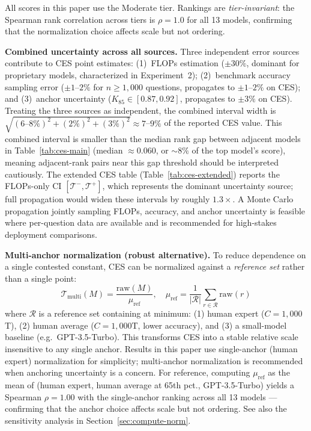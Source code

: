 \documentclass[12pt]{article}
\begin{document}
All scores in this paper use the Moderate tier. Rankings are \textit{tier-invariant}: the Spearman rank correlation across tiers is $\rho = 1.0$ for all 13 models, confirming that the normalization choice affects scale but not ordering.

\noindent\textbf{Combined uncertainty across all sources.} Three independent error sources contribute to CES point estimates: (1)~FLOPs estimation ($\pm 30\%$, dominant for proprietary models, characterized in Experiment~2); (2)~benchmark accuracy sampling error ($\pm 1$--$2\%$ for $n \geq 1{,}000$ questions, propagates to $\pm 1$--$2\%$ on CES); and (3)~anchor uncertainty ($K_{85} \in [0.87, 0.92]$, propagates to $\pm 3\%$ on CES). Treating the three sources as independent, the combined interval width is $\sqrt{(6\text{--}8\%)^2 + (2\%)^2 + (3\%)^2} \approx 7$--$9\%$ of the reported CES value. This combined interval is smaller than the median rank gap between adjacent models in Table~\ref{tab:ces-main} (median $\approx 0.060$, or $\sim 8\%$ of the top model's score), meaning adjacent-rank pairs near this gap threshold should be interpreted cautiously. The extended CES table (Table~\ref{tab:ces-extended}) reports the FLOPs-only CI $[\mathcal{T}^-, \mathcal{T}^+]$, which represents the dominant uncertainty source; full propagation would widen these intervals by roughly $1.3\times$. A Monte Carlo propagation jointly sampling FLOPs, accuracy, and anchor uncertainty is feasible where per-question data are available and is recommended for high-stakes deployment comparisons.

\textbf{Multi-anchor normalization (robust alternative).} To reduce dependence on a single contested constant, CES can be normalized against a \textit{reference set} rather than a single point:
\begin{equation}
\mathcal{T}_{\text{multi}}(M) = \frac{\text{raw}(M)}{\mu_{\text{ref}}}, \quad
\mu_{\text{ref}} = \frac{1}{|\mathcal{R}|}\sum_{r \in \mathcal{R}} \text{raw}(r)
\end{equation}
where $\mathcal{R}$ is a reference set containing at minimum: (1) human expert ($C = 1{,}000$T), (2) human average ($C = 1{,}000$T, lower accuracy), and (3) a small-model baseline (e.g.\ GPT-3.5-Turbo). This transforms CES into a stable relative scale insensitive to any single anchor. Results in this paper use single-anchor (human expert) normalization for simplicity; multi-anchor normalization is recommended when anchoring uncertainty is a concern. For reference, computing $\mu_\text{ref}$ as the mean of (human expert, human average at 65th pct., GPT-3.5-Turbo) yields a Spearman $\rho = 1.00$ with the single-anchor ranking across all 13 models --- confirming that the anchor choice affects scale but not ordering. See also the sensitivity analysis in Section~\ref{sec:compute-norm}.
\end{document}
